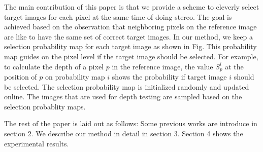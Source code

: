 The main contribution of this paper is that we provide a scheme to cleverly select target images for each pixel at the same time of doing stereo. The goal is achieved based on the observation that neighboring pixels on the reference image are like to have the same set of correct target images. In our method, we keep a selection probability map for each target image as shown in Fig. This probability map guides on the pixel level if the target image should be selected. For example, to calculate the depth of a pixel $p$ in the reference image, the value $S_p^i$ at the position of $p$ on probability map $i$ shows the probability if target image $i$ should be selected. The selection probability map is initialized randomly and updated online. The images that are used for depth testing are sampled based on the selection probablity maps.

The rest of the paper is laid out as follows: Some previous works are introduce in section 2. We describe our method in detail in section 3. Section 4 shows the experimental results.

